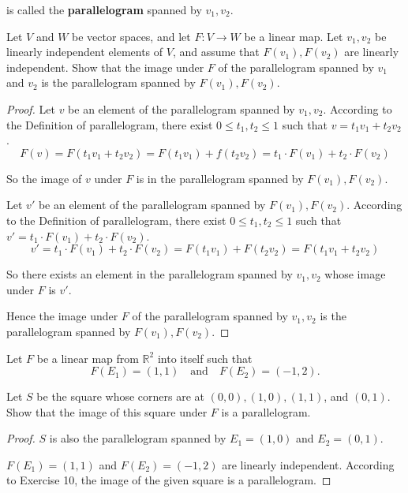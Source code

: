 is called the \textbf{parallelogram} spanned by $v_{1}, v_{2}$.

\begin{exercise}
    Let $V$ and $W$ be vector spaces, and let $F: V \to W$ be a linear map. Let $v_{1}, v_{2}$ be linearly independent elements of $V$, and assume that $F(v_{1}), F(v_{2})$ are linearly independent. Show that the image under $F$ of the parallelogram spanned by $v_{1}$ and $v_{2}$ is the parallelogram spanned by $F(v_{1}), F(v_{2})$.
\end{exercise}

\begin{proof}
    Let $v$ be an element of the parallelogram spanned by $v_{1}, v_{2}$. According to the Definition of parallelogram, there exist $0\leq t_{1}, t_{2} \leq 1$ such that $v = t_{1}v_{1} + t_{2}v_{2}$.
    \[
        F(v) = F(t_{1}v_{1} + t_{2}v_{2}) = F(t_{1}v_{1}) + f(t_{2}v_{2}) = t_{1}\cdot F(v_{1}) + t_{2}\cdot F(v_{2})
    \]

    So the image of $v$ under $F$ is in the parallelogram spanned by $F(v_{1}), F(v_{2})$.

    Let $v'$ be an element of the parallelogram spanned by $F(v_{1}), F(v_{2})$. According to the Definition of parallelogram, there exist $0\leq t_{1}, t_{2} \leq 1$ such that $v' = t_{1}\cdot F(v_{1}) + t_{2}\cdot F(v_{2})$.
    \[
        v' = t_{1}\cdot F(v_{1}) + t_{2}\cdot F(v_{2}) = F(t_{1}v_{1}) + F(t_{2}v_{2}) = F(t_{1}v_{1} + t_{2}v_{2})
    \]

    So there exists an element in the parallelogram spanned by $v_{1}, v_{2}$ whose image under $F$ is $v'$.

    Hence the image under $F$ of the parallelogram spanned by $v_{1}, v_{2}$ is the parallelogram spanned by $F(v_{1}), F(v_{2})$.
\end{proof}

\begin{exercise}
    Let $F$ be a linear map from $\mathbb{R}^{2}$ into itself such that
    \[
        F(E_{1}) = (1, 1) \quad\text{and}\quad F(E_{2}) = (-1, 2).
    \]

    Let $S$ be the square whose corners are at $(0, 0), (1, 0), (1, 1)$, and $(0, 1)$. Show that the image of this square under $F$ is a parallelogram.
\end{exercise}

\begin{proof}
    $S$ is also the parallelogram spanned by $E_{1} = (1, 0)$ and $E_{2} = (0, 1)$.

    $F(E_{1}) = (1, 1)$ and $F(E_{2}) = (-1, 2)$ are linearly independent. According to Exercise 10, the image of the given square is a parallelogram.
\end{proof}

